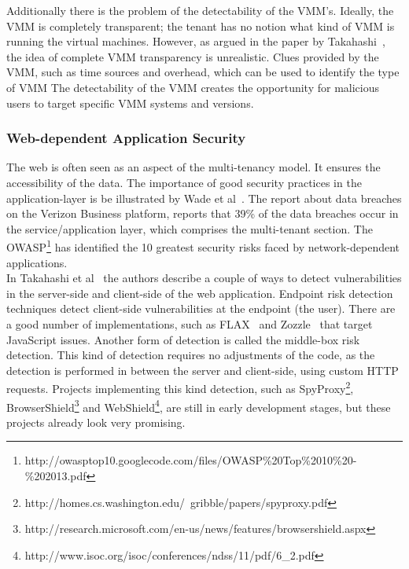 Additionally there is the problem of the detectability of the \ac{VMM}’s. Ideally, the \ac{VMM} is completely transparent; the tenant has no notion what kind of \ac{VMM} is running the virtual machines. 
However, as argued in the paper by Takahashi~\cite{Takahashi2012Security}, the idea of complete \ac{VMM} transparency is unrealistic. 
Clues provided by the \ac{VMM}, such as time sources and overhead, which can be used to identify the type of \ac{VMM}
The detectability of the \ac{VMM} creates the opportunity for malicious users to target specific \ac{VMM} systems and versions.

\subsubsection{Web-dependent Application Security}
The web is often seen as an aspect of the multi-tenancy model. 
It ensures the accessibility of the data. 
The importance of good security practices in the application-layer is be illustrated by Wade et al~\cite{Wade2008Security}.
The report about data breaches on the Verizon Business platform, reports that 39\% of the data breaches occur in the service/application layer, which comprises the multi-tenant section. The \ac{OWASP}\footnote{http://owasptop10.googlecode.com/files/OWASP\%20Top\%2010\%20-\%202013.pdf} has identified the 10 greatest security risks faced by network-dependent applications.\\

In Takahashi et al~\cite{Takahashi2012Security} the authors describe a couple of ways to detect vulnerabilities in the server-side and client-side of the web application. 
Endpoint risk detection techniques detect client-side vulnerabilities at the endpoint (the user). 
There are a good number of implementations, such as FLAX~\cite{saxena10kudzu} and Zozzle~\cite{curtsinger2011zozzle} that target JavaScript issues. 
Another form of detection is called the middle-box risk detection. 
This kind of detection requires no adjustments of the code, as the detection is performed in between the server and client-side, using custom HTTP requests. 
Projects implementing this kind detection, such as SpyProxy\footnote{http://homes.cs.washington.edu/~gribble/papers/spyproxy.pdf}, BrowserShield\footnote{http://research.microsoft.com/en-us/news/features/browsershield.aspx} and WebShield\footnote{http://www.isoc.org/isoc/conferences/ndss/11/pdf/6_2.pdf}, are still in early development stages, but these projects already look very promising.

